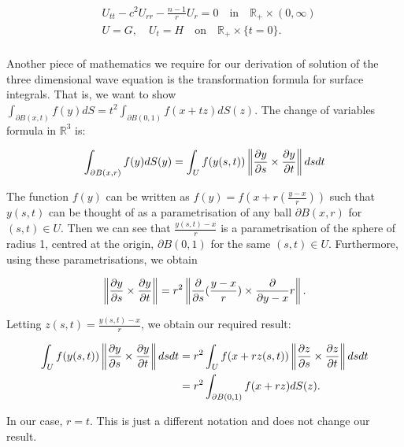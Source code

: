 \documentclass[12pt]{article}
\numberwithin{equation}{section}
\begin{document}
\begin{equation} \label{EPDeq}
    \begin{aligned}
        &U_{tt}-c^2U_{rr}-\frac{n-1}{r}U_r=0 \quad \textrm{in} \quad \mathbb{R}_+ \times (0,\infty)\\
        &U=G, \quad U_t=H \quad \textrm{on} \quad \mathbb{R}_+ \times \{ t=0 \}.
    \end{aligned}
\end{equation}
\\

Another piece of mathematics we require for our derivation of solution of the three dimensional wave equation is the transformation formula for surface integrals. That is,
we want to show $\int_{\partial B(x,t)}f(y)dS=t^2\int_{\partial B(0,1)} f(x+tz)dS(z)$. The change of variables formula in $\mathbb{R}^3$ \cite{LooSter} is:

\begin{equation*}
    \int_{\partial B(x,r)}f(y)dS(y)=\int_U f(y(s,t))\left\| \diffp[1]{y}{s} \times \diffp[1]{y}{t} \right \|ds dt
\end{equation*}

The function $f(y)$ can be written as $f(y)=f(x+r(\frac{y-x}{r}))$ such that $y(s,t)$ can be thought of as a parametrisation of any ball $\partial B(x,r)$ for $(s,t)\in U$. Then we can see
that $\frac{y(s,t)-x}{r}$ is a parametrisation of the sphere of radius 1, centred at the origin, $\partial B(0,1)$ for the same $(s,t)\in U$. Furthermore, using these parametrisations, we obtain

\begin{equation*}
    \left \| \diffp[1]{y}{s} \times \diffp[1]{y}{t} \right \| =r^2 \left \| \diffp[1]{}{s}(\frac{y-x}{r}) \times \diffp[1]{}{y-x}{r} \right \|.
\end{equation*}

Letting $z(s,t)=\frac{y(s,t)-x}{r}$, we obtain our required result:

\begin{equation*}
    \begin{aligned}
    \int_U f(y(s,t)) \left \| \diffp[1]{y}{s} \times \diffp{y}{t} \right \| dsdt&=r^2\int_U f(x+rz(s,t)) \left \| \diffp[1]{z}{s} \times \diffp[1]{z}{t} \right \| dsdt\\
    &=r^2\int_{\partial B(0,1)}f(x+rz)dS(z).
    \end{aligned}
\end{equation*}

In our case, $r=t$. This is just a different notation and does not change our result.
\end{document}
